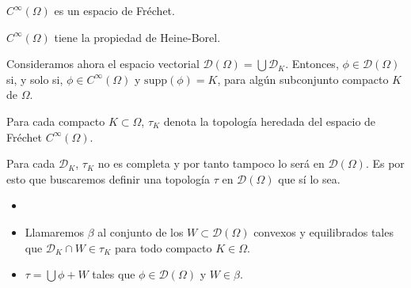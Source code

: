\begin{lema}
$C^{\infty}(\Omega)$ es un espacio de Fréchet.
\end{lema}

\begin{lema}
$C^{\infty}(\Omega)$ tiene la propiedad de Heine-Borel.

\end{lema}


\begin{definicion}
Consideramos ahora el espacio vectorial $\mathcal{D}(\Omega) = \bigcup \mathcal{D}_{K}$. Entonces, $\phi\in \mathcal{D}(\Omega)$ si, y solo si, $\phi\in C^{\infty}(\Omega)$ y $\mathrm{supp}(\phi) = K$, para algún subconjunto compacto $K$ de $\Omega$.
\end{definicion}

\begin{definicion}
Para cada compacto $K\subset\Omega$, $\tau_K$ denota la topología heredada del espacio de Fréchet $C^{\infty}(\Omega)$.  
\end{definicion}

 Para cada $\mathcal{D}_{K}$, $\tau_K$ no es completa y por tanto tampoco lo será en $ \mathcal{D}(\Omega)$. Es por esto que buscaremos definir una topología $\tau$ en $ \mathcal{D}(\Omega)$ que sí lo sea.
\begin{definicion}

\begin{itemize}
\item[]
\item Llamaremos $\beta$ al conjunto de los $W\subset  \mathcal{D}(\Omega)$ convexos y equilibrados tales que $ \mathcal{D}_{K}\cap W \in \tau_{K}$ para todo compacto $K\in \Omega$.
\item $\tau = \bigcup \phi + W$ tales que $\phi\in \mathcal{D}(\Omega)$ y $ W\in\beta$.
\end{itemize}
\end{definicion}

